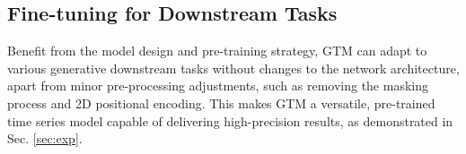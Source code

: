 \subsection{Fine-tuning for Downstream Tasks}
Benefit from the model design and pre-training strategy, GTM can adapt to various generative downstream tasks without changes to the network architecture, apart from minor pre-processing adjustments, such as removing the masking process and 2D positional encoding. This makes GTM a versatile, pre-trained time series model capable of delivering high-precision results, as demonstrated in Sec. \ref{sec:exp}.


